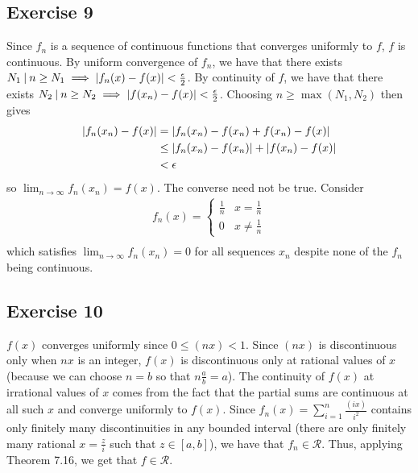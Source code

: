\subsection{Exercise 9}
Since $f_n$ is a sequence of continuous functions that converges uniformly to $f$, $f$ is continuous. By
uniform convergence of $f_n$, we have that there exists 
$N_1 \: | \: n  \geq N_1 \implies \abs{f_n(x) - f(x)} < \frac{\epsilon}{2}$. By continuity of $f$, we have that there
exists $N_2 \: | \: n \geq N_2 \implies \abs{f(x_n) - f(x)} < \frac{\epsilon}{2}$. 
Choosing $n \geq \max(N_1, N_2)$ then gives
\begin{align*}
        \abs{f_n(x_n) - f(x)} &= \abs{f_n(x_n) - f(x_n) + f(x_n) - f(x)} \\
                              &\leq \abs{f_n(x_n) - f(x_n)} + \abs{f(x_n) - f(x)} \\
                              &< \epsilon
\end{align*}
so $\lim_{n \to \infty} f_n(x_n) = f(x)$. The converse need not be true. Consider
\begin{align*}
        f_n(x) = 
        \begin{cases}
                \frac{1}{n} & x = \frac{1}{n} \\
                0 & x \neq \frac{1}{n}
        \end{cases} \\
\end{align*}
which satisfies $\lim_{n \to \infty} f_n(x_n) = 0$ for all sequences $x_n$ despite none of the $f_n$ being
continuous. 

\subsection{Exercise 10}
$f(x)$ converges uniformly since $0 \leq (nx) < 1$. Since $(nx)$ is discontinuous only when $nx$ is an integer,
$f(x)$ is discontinuous only at rational values of $x$ (because we can choose $n = b$ so that 
$n\frac{a}{b} = a$). The continuity of $f(x)$ at irrational values of $x$ comes from the fact that the partial
sums are continuous at all such $x$ and converge uniformly to $f(x)$. Since 
$f_n(x) = \sum_{i = 1}^n \frac{(ix)}{i^2}$ contains only finitely many discontinuities in any bounded interval
(there are only finitely many rational $x = \frac{z}{i}$ such that $z \in [a, b]$), we have that 
$f_n \in \mathscr{R}$. Thus, applying Theorem 7.16, we get that $f \in \mathscr{R}$.
